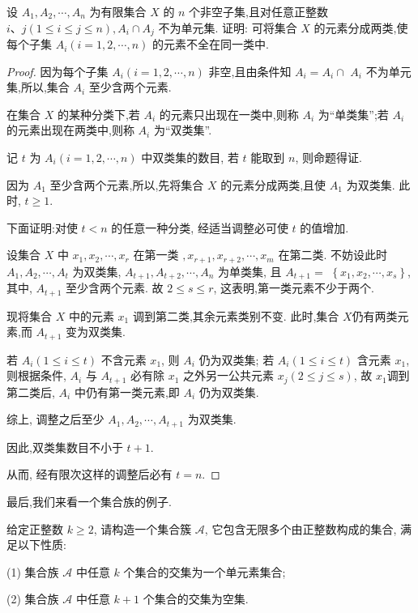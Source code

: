\begin{example}
	设 $A_{1}, A_{2}, \cdots, A_{n}$ 为有限集合 $X$ 的 $n$ 个非空子集,且对任意正整数 $i 、 j(1 \leqslant i \leqslant j \leqslant n), A_{i} \cap A_{j}$ 不为单元集. 证明: 可将集合 $X$ 的元素分成两类,使每个子集 $A_{i}(i=1,2, \cdots, n)$ 的元素不全在同一类中.
\end{example}

\begin{proof}
	因为每个子集 $A_{i}(i=1,2, \cdots, n)$ 非空,且由条件知 $A_{i}=A_{i} \cap$ $A_{i}$ 不为单元集,所以,集合 $A_{i}$ 至少含两个元素.

	在集合 $X$ 的某种分类下,若 $A_{i}$ 的元素只出现在一类中,则称 $A_{i}$ 为“单类集”;若 $A_{i}$ 的元素出现在两类中,则称 $A_{i}$ 为“双类集”.

	记 $t$ 为 $A_{i}(i=1,2, \cdots, n)$ 中双类集的数目, 若 $t$ 能取到 $n$, 则命题得证.

	因为 $A_{1}$ 至少含两个元素,所以,先将集合 $X$ 的元素分成两类,且使 $A_{1}$ 为双类集. 此时, $t \geqslant 1$.

	下面证明:对使 $t<n$ 的任意一种分类, 经适当调整必可使 $t$ 的值增加.

	设集合 $X$ 中 $x_{1}, x_{2}, \cdots, x_{r}$ 在第一类 $, x_{r+1}, x_{r+2}, \cdots, x_{m}$ 在第二类. 不妨设此时 $A_{1}, A_{2}, \cdots, A_{t}$ 为双类集, $A_{t+1}, A_{t+2}, \cdots, A_{n}$ 为单类集, 且 $A_{t+1}=$ $\left\{x_{1}, x_{2}, \cdots, x_{s}\right\}$, 其中, $A_{t+1}$ 至少含两个元素. 故 $2 \leqslant s \leqslant r$, 这表明,第一类元素不少于两个.

	现将集合 $X$ 中的元素 $x_{1}$ 调到第二类,其余元素类别不变. 此时,集合 $X$仍有两类元素,而 $A_{t+1}$ 变为双类集.

	若 $A_{i}(1 \leqslant i \leqslant t)$ 不含元素 $x_{1}$, 则 $A_{i}$ 仍为双类集; 若 $A_{i}(1 \leqslant i \leqslant t)$ 含元素 $x_{1}$, 则根据条件, $A_{i}$ 与 $A_{t+1}$ 必有除 $x_{1}$ 之外另一公共元素 $x_{j}(2 \leqslant j \leqslant s)$, 故 $x_{1}$调到第二类后, $A_{i}$ 中仍有第一类元素,即 $A_{i}$ 仍为双类集.

	综上, 调整之后至少 $A_{1}, A_{2}, \cdots, A_{t+1}$ 为双类集.

	因此,双类集数目不小于 $t+1$.

	从而, 经有限次这样的调整后必有 $t=n$.
\end{proof}

最后,我们来看一个集合族的例子.

\begin{example}
	给定正整数 $k \geqslant 2$, 请构造一个集合簇 $\mathscr{A}$, 它包含无限多个由正整数构成的集合, 满足以下性质:

	(1) 集合族 $\mathscr{A}$ 中任意 $k$ 个集合的交集为一个单元素集合;

	(2) 集合族 $\mathscr{A}$ 中任意 $k+1$ 个集合的交集为空集.
\end{example}

